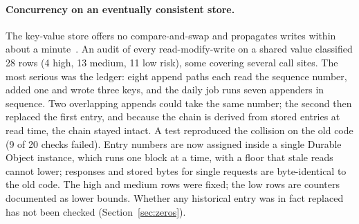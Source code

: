 \documentclass[11pt,a4paper]{article}
\begin{document}
\paragraph{Concurrency on an eventually consistent store.} The key-value store offers no compare-and-swap and propagates writes within about a minute~\citep{cfkv}. An audit of every read-modify-write on a shared value classified 28 rows (4 high, 13 medium, 11 low risk), some covering several call sites. The most serious was the ledger: eight append paths each read the sequence number, added one and wrote three keys, and the daily job runs seven appenders in sequence. Two overlapping appends could take the same number; the second then replaced the first entry, and because the chain is derived from stored entries at read time, the chain stayed intact. A test reproduced the collision on the old code (9 of 20 checks failed). Entry numbers are now assigned inside a single Durable Object instance, which runs one block at a time, with a floor that stale reads cannot lower; responses and stored bytes for single requests are byte-identical to the old code. The high and medium rows were fixed; the low rows are counters documented as lower bounds. Whether any historical entry was in fact replaced has not been checked (Section~\ref{sec:zeros}).
\end{document}
